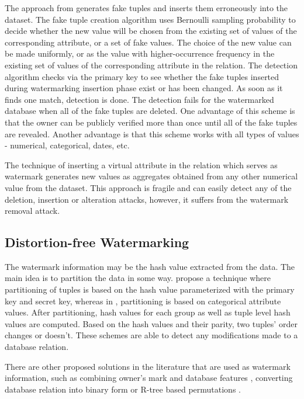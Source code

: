 The approach from \cite{pournaghshband2008new} generates fake tuples and inserts them erroneously into the dataset. 
The fake tuple creation algorithm uses Bernoulli sampling probability to decide whether the new value will be chosen from the existing set of values of the corresponding attribute, or a set of fake values. 
The choice of the new value can be made uniformly, or as the value with higher-occurrence frequency in the existing set of values of the corresponding attribute in the relation. 
The detection algorithm checks via the primary key to see whether the fake tuples inserted during watermarking insertion phase exist or has been changed. As soon as it finds one match, detection is done. 
The detection fails for the watermarked database when all of the fake tuples are deleted.
One advantage of this scheme is that the owner can be publicly verified more than once until all of the fake tuples are revealed.
Another advantage is that this scheme works with all types of values - numerical, categorical, dates, etc.

The technique of inserting a virtual attribute in the relation which serves as watermark \cite{prasannakumari2009robust} generates new values as aggregates obtained from any other numerical value from the dataset. 
This approach is fragile and can easily detect any of the deletion, insertion or alteration attacks, however, it suffers from the watermark removal attack.  

\subsection{Distortion-free Watermarking}
The watermark information may be the hash value extracted from the data.      
The main idea is to partition the data in some way. 
\cite{li2004tamper} propose a technique where partitioning of tuples is based on the hash value parameterized with the primary key and secret key, whereas in \cite{bhattacharya2010distortion}, partitioning is based on categorical attribute values. 
After partitioning, hash values for each group as well as tuple level hash values are computed. Based on the hash values and their parity, two tuples' order changes or doesn't. 
These schemes are able to detect any modifications made to a database relation.

There are other proposed solutions in the literature that are used as watermark information, such as combining owner's mark and database features \cite{tsai2006database}, converting database relation into binary form \cite{li2006publicly,bhattacharya2009generic} or R-tree based permutations \cite{kamel2009schema}.

